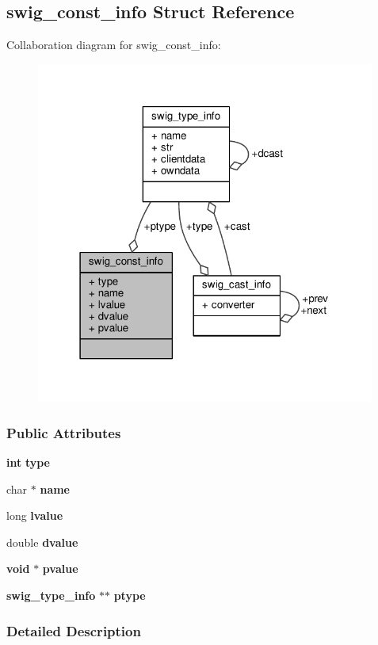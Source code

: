 \subsection{swig\+\_\+const\+\_\+info Struct Reference}
\label{structswig__const__info}


Collaboration diagram for swig\+\_\+const\+\_\+info\+:
\nopagebreak
\begin{figure}[H]
\begin{center}
\leavevmode
\includegraphics[width=316pt]{d6/dc3/structswig__const__info__coll__graph}
\end{center}
\end{figure}
\subsubsection*{Public Attributes}
\begin{DoxyCompactItemize}
\item 
{\bf int} {\bf type}
\item 
char $\ast$ {\bf name}
\item 
long {\bf lvalue}
\item 
double {\bf dvalue}
\item 
{\bf void} $\ast$ {\bf pvalue}
\item 
{\bf swig\+\_\+type\+\_\+info} $\ast$$\ast$ {\bf ptype}
\end{DoxyCompactItemize}


\subsubsection{Detailed Description}


